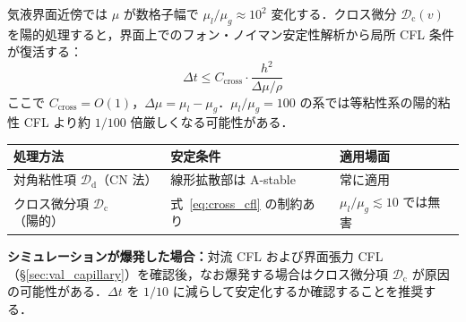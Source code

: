 \begin{tcolorbox}[warnbox, title={変粘性界面でのクロス微分陽的処理：粘性 CFL 条件の実質的復活}]
\label{warn:cross_cfl}

気液界面近傍では $\mu$ が数格子幅で $\mu_l/\mu_g \approx 10^2$ 変化する．クロス微分 $\mathcal{D}_{\mathrm{c}}(v)$ を陽的処理すると，界面上でのフォン・ノイマン安定性解析から局所 CFL 条件が復活する：
\begin{equation}
  \Delta t \le C_{\mathrm{cross}} \cdot \frac{h^2}{\Delta\mu / \rho}
  \label{eq:cross_cfl}
\end{equation}
ここで $C_{\mathrm{cross}} = O(1)$，$\Delta\mu = \mu_l - \mu_g$．$\mu_l/\mu_g = 100$ の系では等粘性系の陽的粘性 CFL より約 $1/100$ 倍厳しくなる可能性がある．

\begin{center}
\renewcommand{\arraystretch}{1.3}
\begin{tabular}{lll}
\hline
処理方法 & 安定条件 & 適用場面 \\
\hline
対角粘性項 $\mathcal{D}_{\mathrm{d}}$（CN 法） & 線形拡散部は A-stable & 常に適用 \\
クロス微分項 $\mathcal{D}_{\mathrm{c}}$（陽的） & 式~\eqref{eq:cross_cfl} の制約あり & $\mu_l/\mu_g \lesssim 10$ では無害 \\
\hline
\end{tabular}
\end{center}

\textbf{シミュレーションが爆発した場合：}対流 CFL および界面張力 CFL（§\ref{sec:val_capillary}）を確認後，なお爆発する場合はクロス微分項 $\mathcal{D}_{\mathrm{c}}$ が原因の可能性がある．$\Delta t$ を $1/10$ に減らして安定化するか確認することを推奨する．
\end{tcolorbox}

